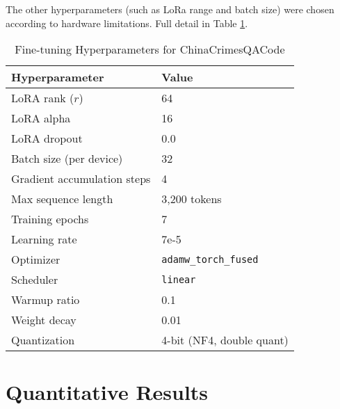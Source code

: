The other hyperparameters (such as LoRa range and batch size) were chosen according to hardware limitations. Full detail in Table \ref{tab:hyperparameters}.

\begin{table}[hbtp]
\centering
\small
\begin{tabular}{ll}
  \toprule
  \textbf{Hyperparameter} & \textbf{Value} \\
  \midrule
  LoRA rank ($r$) & 64 \\
  LoRA alpha & 16 \\
  LoRA dropout & 0.0 \\
Batch size (per device) & 32 \\
Gradient accumulation steps & 4 \\
Max sequence length & 3,200 tokens \\
Training epochs & 7 \\
Learning rate & 7e-5 \\
Optimizer & \texttt{adamw\_torch\_fused} \\
Scheduler & \texttt{linear} \\
Warmup ratio & 0.1 \\
Weight decay & 0.01 \\
Quantization & 4-bit (NF4, double quant) \\
\bottomrule
\end{tabular}
\caption{Fine-tuning Hyperparameters for ChinaCrimesQACode}
\label{tab:hyperparameters}
\end{table}

\section{Quantitative Results}

